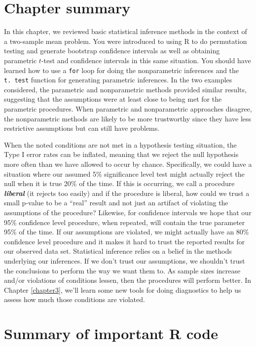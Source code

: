 \documentclass[]{book}
\begin{document}
\section{Chapter summary}\label{section2-10}

In this chapter, we reviewed basic statistical inference methods in the
context of a two-sample mean problem. You were introduced to using R to
do permutation testing and generate bootstrap confidence intervals as
well as obtaining parametric \(t\)-test and confidence intervals in this
same situation. You should have learned how to use a \texttt{for} loop
for doing the nonparametric inferences and the \texttt{t.\ test}
function for generating parametric inferences. In the two examples
considered, the parametric and nonparametric methods provided similar
results, suggesting that the assumptions were at least close to being
met for the parametric procedures. When parametric and nonparametric
approaches disagree, the nonparametric methods are likely to be more
trustworthy since they have less restrictive assumptions but can still
have problems.

When the noted conditions are not met in a hypothesis testing situation,
the Type I error rates can be inflated, meaning that we reject the null
hypothesis more often than we have allowed to occur by chance.
Specifically, we could have a situation where our assumed 5\%
significance level test might actually reject the null when it is true
20\% of the time. If this is occurring, we call a procedure
\textbf{\emph{liberal}} (it rejects too easily) and if the procedure is
liberal, how could we trust a small p-value to be a ``real'' result and
not just an artifact of violating the assumptions of the procedure?
Likewise, for confidence intervals we hope that our 95\% confidence
level procedure, when repeated, will contain the true parameter 95\% of
the time. If our assumptions are violated, we might actually have an
80\% confidence level procedure and it makes it hard to trust the
reported results for our observed data set. Statistical inference relies
on a belief in the methods underlying our inferences. If we don't trust
our assumptions, we shouldn't trust the conclusions to perform the way
we want them to. As sample sizes increase and/or violations of
conditions lessen, then the procedures will perform better. In Chapter
\ref{chapter3}, we'll learn some new tools for doing diagnostics to help
us assess how much those conditions are violated.

\section{Summary of important R code}\label{section2-11}
\end{document}
